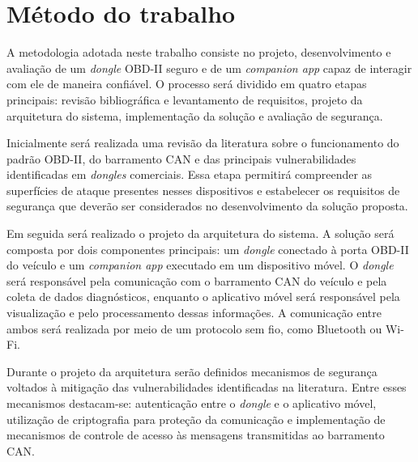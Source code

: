 \chapter{Método do trabalho} \label{cap:metodo}


A metodologia adotada neste trabalho consiste no projeto, desenvolvimento e
avaliação de um \textit{dongle} OBD-II seguro e de um \textit{companion app}
capaz de interagir com ele de maneira confiável. O processo será dividido em
quatro etapas principais: revisão bibliográfica e levantamento de requisitos,
projeto da arquitetura do sistema, implementação da solução e avaliação de
segurança.

Inicialmente será realizada uma revisão da literatura sobre o funcionamento do
padrão OBD-II, do barramento CAN e das principais vulnerabilidades
identificadas em \textit{dongles} comerciais. Essa etapa permitirá compreender
as superfícies de ataque presentes nesses dispositivos e estabelecer os
requisitos de segurança que deverão ser considerados no desenvolvimento da
solução proposta.

Em seguida será realizado o projeto da arquitetura do sistema. A solução será
composta por dois componentes principais: um \textit{dongle} conectado à porta
OBD-II do veículo e um \textit{companion app} executado em um dispositivo
móvel. O \textit{dongle} será responsável pela comunicação com o barramento CAN
do veículo e pela coleta de dados diagnósticos, enquanto o aplicativo móvel
será responsável pela visualização e pelo processamento dessas informações. A
comunicação entre ambos será realizada por meio de um protocolo sem fio, como
Bluetooth ou Wi-Fi.

Durante o projeto da arquitetura serão definidos mecanismos de segurança
voltados à mitigação das vulnerabilidades identificadas na literatura. Entre
esses mecanismos destacam-se: autenticação entre o \textit{dongle} e o
aplicativo móvel, utilização de criptografia para proteção da comunicação e
implementação de mecanismos de controle de acesso às mensagens transmitidas ao
barramento CAN.

